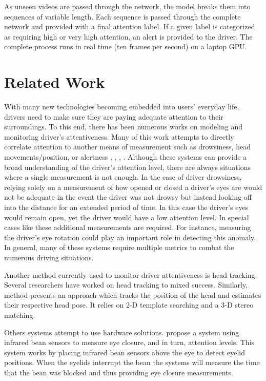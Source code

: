 \documentclass[10pt, conference, compsocconf]{IEEEtran}
\begin{document}
As unseen videos are passed through the network, the model breaks them into sequences of variable length. Each sequence is passed through the complete network and provided with a final attention label. If a given label is categorized as requiring high or very high attention, an alert is provided to the driver. The complete process runs in real time (ten frames per second) on a laptop GPU.

\section{Related Work}
With many new technologies becoming embedded into users' everyday life, drivers need to make sure they are paying adequate attention to their surroundings. To this end, there has been numerous works on modeling and monitoring driver's attentiveness. Many of this work attempts to directly correlate attention to another means of measurement such as drowsiness, head movements/position, or alertness \cite{10.1007/3-540-48222-9_8}, \cite{WU20081556}, \cite{639576}, \cite{s121216937}. Although these systems can provide a broad understanding of the driver's attention level, there are always situations where a single measurement is not enough. In the case of driver drowsiness, relying solely on a measurement of how opened or closed a driver's eyes are would not be adequate in the event the driver was not drowsy but instead looking off into the distance for an extended period of time. In this case the driver's eyes would remain open, yet the driver would have a low attention level. In special cases like these additional measurements are required. For instance, measuring the driver's eye rotation could play an important role in detecting this anomaly. In general, many of these systems require multiple metrics to combat the numerous driving situations.

Another method currently used to monitor driver attentiveness is head tracking. Several researchers have worked on head tracking \cite{GEE1994639} to mixed success. Similarly, method \cite{840680} presents an approach which tracks the position of the head and estimates their respective head pose. It relies on 2-D template searching and a 3-D stereo matching. 

Others systems attempt to use hardware solutions. \cite{Selker:2001:EGE:634067.634176} propose a system using infrared bean sensors to measure eye closure, and in turn, attention levels. This system works by placing infrared bean sensors above the eye to detect eyelid positions. When the eyelids interrupt the bean the systems will measure the time that the bean was blocked and thus providing eye closure measurements.
\end{document}
